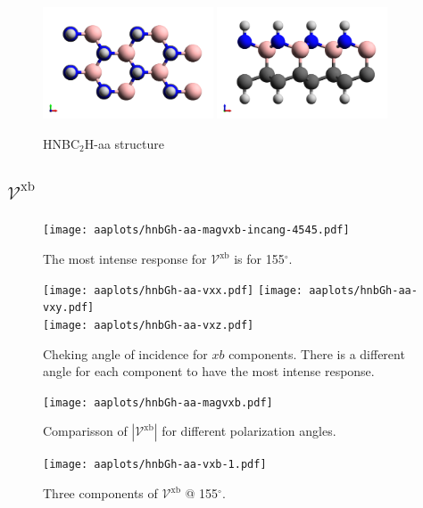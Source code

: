 \documentclass{article}
\let\Oldsubsection\subsection
\renewcommand{\subsection}{\FloatBarrier\Oldsubsection}
\begin{document}
\begin{figure}[h]
    \centering
    \includegraphics[width=0.45\textwidth]{../hnbGh-aa/hnbGh-aa-figures/hnbGh-aa-1}
    \includegraphics[width=0.45\textwidth]{../hnbGh-aa/hnbGh-aa-figures/hnbGh-aa-2}
    \caption{HNBC$_{2}$H-aa structure}
    \label{fig:aastruc}
\end{figure}

\subsection{$\mathcal{V}^{\mathrm{xb}} $}
\begin{figure}[ht!]
    \centering
    \texttt{[image: aaplots/hnbGh-aa-magvxb-incang-4545.pdf]}
    \caption{The most intense response for $\mathcal{V}^{\mathrm{xb}} $ is for 
    155$^{\circ}$.}
    \label{fig:aa-magvxbincang}
\end{figure}
\begin{figure}[ht!]
    \centering
    \texttt{[image: aaplots/hnbGh-aa-vxx.pdf]}
    \texttt{[image: aaplots/hnbGh-aa-vxy.pdf]}\\
    \texttt{[image: aaplots/hnbGh-aa-vxz.pdf]}
    \caption{Cheking angle of incidence for $xb$ components. There is a
    different angle for each component to have the most intense response.}
    \label{fig:aa-xbangcomp}
\end{figure}
\begin{figure}[ht!]
    \centering
    \texttt{[image: aaplots/hnbGh-aa-magvxb.pdf]}
    \caption{Comparisson of $|\mathcal{V}^{\mathrm{xb}}|$ for different
    polarization angles.}
    \label{fig:aa-magvxb}
\end{figure}
\begin{figure}[ht!]
    \centering
    \texttt{[image: aaplots/hnbGh-aa-vxb-1.pdf]}
    \caption{Three components of $\mathcal{V}^{\mathrm{xb}} $ @ 155$^{\circ}$.}
    \label{fig:aa-vxb1}
\end{figure}
\end{document}

